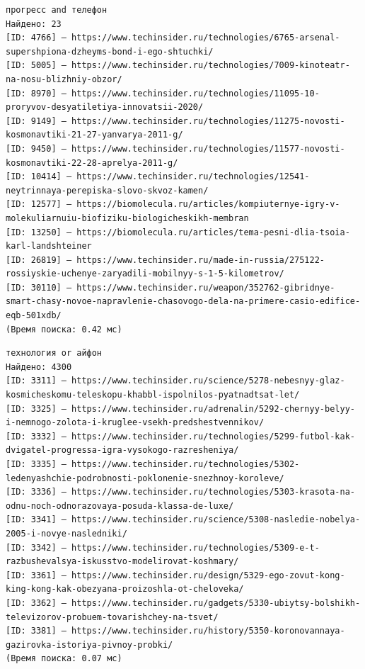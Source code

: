 \documentclass[pdf, unicode, 12pt, a4paper, oneside, fleqn]{article}
\begin{document}
\begin{verbatim}
прогресс and телефон
Найдено: 23
[ID: 4766] — https://www.techinsider.ru/technologies/6765-arsenal-supershpiona-dzheyms-bond-i-ego-shtuchki/
[ID: 5005] — https://www.techinsider.ru/technologies/7009-kinoteatr-na-nosu-blizhniy-obzor/
[ID: 8970] — https://www.techinsider.ru/technologies/11095-10-proryvov-desyatiletiya-innovatsii-2020/
[ID: 9149] — https://www.techinsider.ru/technologies/11275-novosti-kosmonavtiki-21-27-yanvarya-2011-g/
[ID: 9450] — https://www.techinsider.ru/technologies/11577-novosti-kosmonavtiki-22-28-aprelya-2011-g/
[ID: 10414] — https://www.techinsider.ru/technologies/12541-neytrinnaya-perepiska-slovo-skvoz-kamen/
[ID: 12577] — https://biomolecula.ru/articles/kompiuternye-igry-v-molekuliarnuiu-biofiziku-biologicheskikh-membran
[ID: 13250] — https://biomolecula.ru/articles/tema-pesni-dlia-tsoia-karl-landshteiner
[ID: 26819] — https://www.techinsider.ru/made-in-russia/275122-rossiyskie-uchenye-zaryadili-mobilnyy-s-1-5-kilometrov/
[ID: 30110] — https://www.techinsider.ru/weapon/352762-gibridnye-smart-chasy-novoe-napravlenie-chasovogo-dela-na-primere-casio-edifice-eqb-501xdb/
(Время поиска: 0.42 мс)
\end{verbatim}

\begin{verbatim}
технология or айфон
Найдено: 4300
[ID: 3311] — https://www.techinsider.ru/science/5278-nebesnyy-glaz-kosmicheskomu-teleskopu-khabbl-ispolnilos-pyatnadtsat-let/
[ID: 3325] — https://www.techinsider.ru/adrenalin/5292-chernyy-belyy-i-nemnogo-zolota-i-kruglee-vsekh-predshestvennikov/
[ID: 3332] — https://www.techinsider.ru/technologies/5299-futbol-kak-dvigatel-progressa-igra-vysokogo-razresheniya/
[ID: 3335] — https://www.techinsider.ru/technologies/5302-ledenyashchie-podrobnosti-poklonenie-snezhnoy-koroleve/
[ID: 3336] — https://www.techinsider.ru/technologies/5303-krasota-na-odnu-noch-odnorazovaya-posuda-klassa-de-luxe/
[ID: 3341] — https://www.techinsider.ru/science/5308-nasledie-nobelya-2005-i-novye-nasledniki/
[ID: 3342] — https://www.techinsider.ru/technologies/5309-e-t-razbushevalsya-iskusstvo-modelirovat-koshmary/
[ID: 3361] — https://www.techinsider.ru/design/5329-ego-zovut-kong-king-kong-kak-obezyana-proizoshla-ot-cheloveka/
[ID: 3362] — https://www.techinsider.ru/gadgets/5330-ubiytsy-bolshikh-televizorov-probuem-tovarishchey-na-tsvet/
[ID: 3381] — https://www.techinsider.ru/history/5350-koronovannaya-gazirovka-istoriya-pivnoy-probki/
(Время поиска: 0.07 мс)
\end{verbatim}
\end{document}
